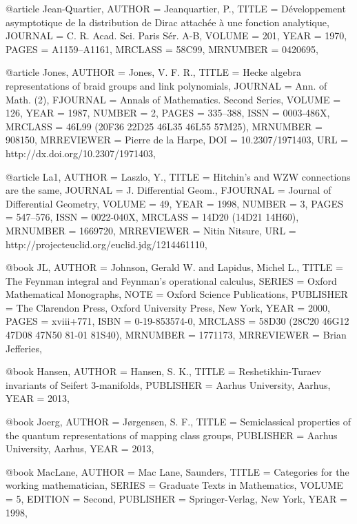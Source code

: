 @article {Jean-Quartier,
    AUTHOR = {Jeanquartier, P.},
     TITLE = {D\'eveloppement asymptotique de la distribution de {D}irac
              attach\'ee \`a une fonction analytique},
   JOURNAL = {C. R. Acad. Sci. Paris S\'er. A-B},
    VOLUME = {201},
      YEAR = {1970},
     PAGES = {A1159--A1161},
   MRCLASS = {58C99},
  MRNUMBER = {0420695},
}

@article {Jones,
    AUTHOR = {Jones, V. F. R.},
     TITLE = {Hecke algebra representations of braid groups and link
              polynomials},
   JOURNAL = {Ann. of Math. (2)},
  FJOURNAL = {Annals of Mathematics. Second Series},
    VOLUME = {126},
      YEAR = {1987},
    NUMBER = {2},
     PAGES = {335--388},
      ISSN = {0003-486X},
   MRCLASS = {46L99 (20F36 22D25 46L35 46L55 57M25)},
  MRNUMBER = {908150},
MRREVIEWER = {Pierre de la Harpe},
       DOI = {10.2307/1971403},
       URL = {http://dx.doi.org/10.2307/1971403},
}

@article {La1,
    AUTHOR = {Laszlo, Y.},
     TITLE = {Hitchin's and {WZW} connections are the same},
   JOURNAL = {J. Differential Geom.},
  FJOURNAL = {Journal of Differential Geometry},
    VOLUME = {49},
      YEAR = {1998},
    NUMBER = {3},
     PAGES = {547--576},
      ISSN = {0022-040X},
   MRCLASS = {14D20 (14D21 14H60)},
  MRNUMBER = {1669720},
MRREVIEWER = {Nitin Nitsure},
       URL = {http://projecteuclid.org/euclid.jdg/1214461110},
}

@book {JL,
    AUTHOR = {Johnson, Gerald W. and Lapidus, Michel L.},
     TITLE = {The {F}eynman integral and {F}eynman's operational calculus},
    SERIES = {Oxford Mathematical Monographs},
      NOTE = {Oxford Science Publications},
 PUBLISHER = {The Clarendon Press, Oxford University Press, New York},
      YEAR = {2000},
     PAGES = {xviii+771},
      ISBN = {0-19-853574-0},
   MRCLASS = {58D30 (28C20 46G12 47D08 47N50 81-01 81S40)},
  MRNUMBER = {1771173},
MRREVIEWER = {Brian Jefferies},
}

@book {Hansen,
    AUTHOR = {Hansen, S. K.},
     TITLE = {Reshetikhin-{T}uraev invariants of {S}eifert {3}-manifolds},
 PUBLISHER = {Aarhus University, Aarhus},
      YEAR = {2013},
}

@book {Joerg,
    AUTHOR = {J\o{}rgensen, S. F.},
     TITLE = {Semiclassical properties of the quantum representations of mapping class groups},
 PUBLISHER = {Aarhus University, Aarhus},
      YEAR = {2013},
}

@book {MacLane,
    AUTHOR = {Mac Lane, Saunders},
     TITLE = {Categories for the working mathematician},
    SERIES = {Graduate Texts in Mathematics},
    VOLUME = {5},
   EDITION = {Second},
 PUBLISHER = {Springer-Verlag, New York},
      YEAR = {1998},
}

